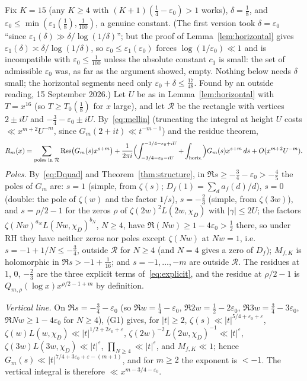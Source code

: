 \documentclass[11pt,a4paper]{article}
\theoremstyle{remark}\newtheorem{remark}[theorem]{Remark}
\begin{document}
Fix $K=15$ (any $K\ge4$ with $(K+1)(\tfrac14-\varepsilon_0)>1$ works), $\delta=\tfrac18$, and
$\varepsilon_0\le\min(\varepsilon_1(\tfrac18),\tfrac1{100})$, a genuine constant. (The first version took $\delta=\varepsilon_0$ ``since
$\varepsilon_1(\delta)\gg\delta/\log(1/\delta)$''; but the proof of Lemma~\ref{lem:horizontal} gives $\varepsilon_1(\delta)\asymp\delta/\log(1/\delta)$,
so $\varepsilon_0\le\varepsilon_1(\varepsilon_0)$ forces $\log(1/\varepsilon_0)\ll1$ and is incompatible with $\varepsilon_0\le\tfrac1{100}$ unless the
absolute constant $c_1$ is small: the set of admissible $\varepsilon_0$ was, as far as the argument showed, empty. Nothing below
needs $\delta$ small; the horizontal segments need only $\varepsilon_0+\delta\le\tfrac{17}{48}$. Found by an outside reading,
15 September 2026.) Let $U$ be as in Lemma~\ref{lem:horizontal} with $T=x^{16}$ (so $T\ge T_0(\tfrac18)$ for $x$ large), and let $\mathcal R$
be the rectangle with vertices $2\pm iU$ and $-\tfrac34-\varepsilon_0\pm iU$. By~\eqref{eq:mellin} (truncating the
integral at height $U$ costs $\ll x^{m+2}U^{-m}$, since $G_m(2+it)\ll t^{-m-1}$) and the residue theorem,
\[
R_m(x)=\sum_{\text{poles in }\mathcal R}\operatorname*{Res}\bigl(G_m(s)x^{s+m}\bigr)+\frac1{2\pi i}\Bigl(\int_{-3/4-\varepsilon_0-iU}^{-3/4-\varepsilon_0+iU}+\int_{\text{horiz.}}\Bigr)G_m(s)x^{s+m}\,ds+O(x^{m+2}U^{-m}).
\]
\emph{Poles.} By~\eqref{eq:Dquad} and Theorem~\ref{thm:structure}, in $\Re s\ge-\tfrac34-\varepsilon_0>-\tfrac45$
the poles of $G_m$ are: $s=1$ (simple, from $\zeta(s)$; $D_f(1)=\sum_da_f(d)/d$), $s=0$ (double: the pole of
$\zeta(w)$ and the factor $1/s$), $s=-\tfrac23$ (simple, from $\zeta(3w)$), and $s=\rho/2-1$ for the zeros $\rho$
of $\zeta(2w)^2L(2w,\chi_D)$ with $|\gamma|\le2U$; the factors $\zeta(Nw)^{a_N}L(Nw,\chi_D)^{b_N}$, $N\ge4$, have
$\Re(Nw)\ge1-4\varepsilon_0>\tfrac12$ there, so under RH they have neither zeros nor poles except
$\zeta(Nw)$ at $Nw=1$, i.e.\ $s=-1+1/N\le-\tfrac34$, outside $\mathcal R$ for $N\ge4$ (and $N=4$ gives a zero
of $D_f$); $M_{f,K}$ is holomorphic in $\Re s>-1+\tfrac1{16}$; and $s=-1,\dots,-m$ are outside $\mathcal R$.
The residues at $1$, $0$, $-\tfrac23$ are the three explicit terms of~\eqref{eq:explicit}, and the residue at
$\rho/2-1$ is $Q_{m,\rho}(\log x)x^{\rho/2-1+m}$ by definition.

\emph{Vertical line.} On $\Re s=-\tfrac34-\varepsilon_0$ (so $\Re w=\tfrac14-\varepsilon_0$, $\Re2w=\tfrac12-2\varepsilon_0$,
$\Re3w=\tfrac34-3\varepsilon_0$, $\Re Nw\ge1-4\varepsilon_0$ for $N\ge4$), (G1) gives, for $|t|\ge2$,
$\zeta(s)\ll|t|^{5/4+\varepsilon_0+\varepsilon}$, $\zeta(w)L(w,\chi_D)\ll|t|^{1/2+2\varepsilon_0+\varepsilon}$,
$\zeta(2w)^{-2}L(2w,\chi_D)^{-1}\ll|t|^{\varepsilon}$, $\zeta(3w)L(3w,\chi_D)\ll|t|^\varepsilon$,
$\prod_{N\ge4}\ll|t|^{\varepsilon}$, and $M_{f,K}\ll1$; hence $G_m(s)\ll|t|^{7/4+3\varepsilon_0+\varepsilon-(m+1)}$, and
for $m\ge2$ the exponent is $<-1$. The vertical integral is therefore $\ll x^{m-3/4-\varepsilon_0}$.
\end{document}
